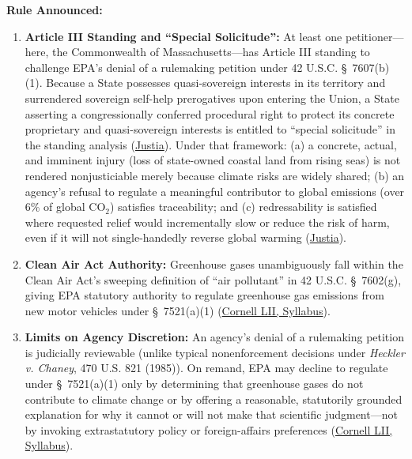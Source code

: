 \documentclass[12pt]{article}
\begin{document}
\textbf{Rule Announced:}
\begin{enumerate}
    \item \textbf{Article III Standing and ``Special Solicitude'':} At least one petitioner---here, the Commonwealth of Massachusetts---has Article III standing to challenge EPA's denial of a rulemaking petition under 42 U.S.C. \S\ 7607(b)(1). Because a State possesses quasi-sovereign interests in its territory and surrendered sovereign self-help prerogatives upon entering the Union, a State asserting a congressionally conferred procedural right to protect its concrete proprietary and quasi-sovereign interests is entitled to ``special solicitude'' in the standing analysis (\href{https://supreme.justia.com/cases/federal/us/549/497/}{Justia}). Under that framework: (a) a concrete, actual, and imminent injury (loss of state-owned coastal land from rising seas) is not rendered nonjusticiable merely because climate risks are widely shared; (b) an agency's refusal to regulate a meaningful contributor to global emissions (over 6\% of global $\mathrm{CO_2}$) satisfies traceability; and (c) redressability is satisfied where requested relief would incrementally slow or reduce the risk of harm, even if it will not single-handedly reverse global warming (\href{https://supreme.justia.com/cases/federal/us/549/497/}{Justia}).
    \item \textbf{Clean Air Act Authority:} Greenhouse gases unambiguously fall within the Clean Air Act's sweeping definition of ``air pollutant'' in 42 U.S.C. \S\ 7602(g), giving EPA statutory authority to regulate greenhouse gas emissions from new motor vehicles under \S\ 7521(a)(1) (\href{https://www.law.cornell.edu/supct/html/05-1120.ZS.html}{Cornell LII, Syllabus}).
    \item \textbf{Limits on Agency Discretion:} An agency's denial of a rulemaking petition is judicially reviewable (unlike typical nonenforcement decisions under \textit{Heckler v. Chaney}, 470 U.S. 821 (1985)). On remand, EPA may decline to regulate under \S\ 7521(a)(1) only by determining that greenhouse gases do not contribute to climate change or by offering a reasonable, statutorily grounded explanation for why it cannot or will not make that scientific judgment---not by invoking extrastatutory policy or foreign-affairs preferences (\href{https://www.law.cornell.edu/supct/html/05-1120.ZS.html}{Cornell LII, Syllabus}).
\end{enumerate}
\end{document}
